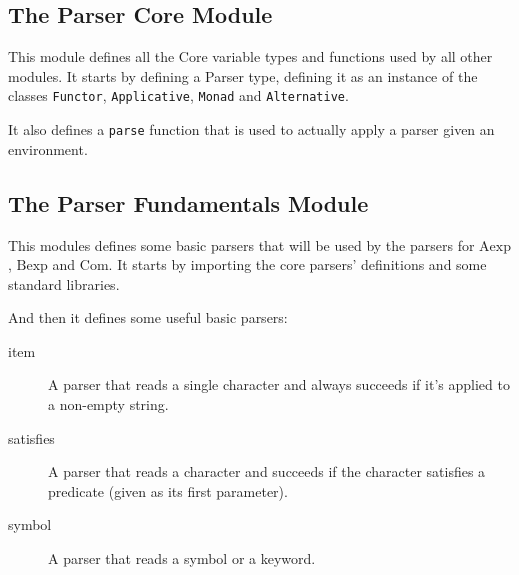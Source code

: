 \documentclass{esposito-documentation}
\begin{document}


\subsection{The Parser Core Module}


This module defines all the Core variable types and functions used by all other
modules. It starts by defining a Parser type, defining it as an instance of the
classes \lstinline|Functor|, \lstinline|Applicative|, \lstinline|Monad| and
\lstinline|Alternative|.







It also defines a \lstinline|parse| function that is used to actually apply a
parser given an environment.


\subsection{The Parser Fundamentals Module}


This modules defines some basic parsers that will be used by the parsers for
$\mathrm{Aexp}$, $\mathrm{Bexp}$ and $\mathrm{Com}$. It starts by importing the
core parsers' definitions and some standard libraries.



And then it defines some useful basic parsers:
\begin{description}
	\item[item] A parser that reads a single character and always succeeds if
		it's applied to a non-empty string.
	\item[satisfies] A parser that reads a character and succeeds if the
		character satisfies a predicate (given as its first parameter).
	\item[symbol] A parser that reads a symbol or a keyword.
\end{description}


\end{document}
